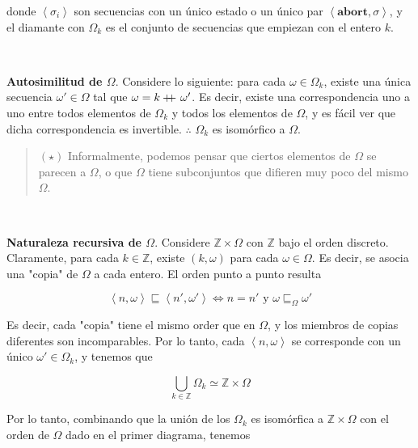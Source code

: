 \documentclass[a4paper, 12pt]{article}
\newcommand\doubleplus{+\kern-1.3ex+\kern0.8ex}
\begin{document}
donde $\left<\sigma_i \right>$ son secuencias con un único estado o un único par
$\left<\textbf{abort}, \sigma \right>$, y el diamante con $\Omega_k$ es el conjunto de
secuencias que empiezan con el entero $k$.

~

\textbf{Autosimilitud de $\Omega$}. Considere lo siguiente: para cada $\omega \in \Omega_k$, existe una única
secuencia $\omega'\in \Omega$ tal que $\omega = k \doubleplus \omega'$. Es
decir, existe una correspondencia uno a uno entre todos elementos de $\Omega_k$ y
todos los elementos de $\Omega$, y es fácil ver que dicha correspondencia es
invertible. $\therefore $ $\Omega_k$ es isomórfico a $\Omega$.

\begin{quote}
$(\star)$ Informalmente, podemos pensar que ciertos elementos de $\Omega$ se parecen a
$\Omega$, o que $\Omega$ tiene subconjuntos que difieren muy poco del mismo
$\Omega$.
\end{quote}
~ 

\textbf{Naturaleza recursiva de $\Omega$}. Considere $\mathbb{Z} \times \Omega$ con $\mathbb{Z}$ bajo el orden discreto.
Claramente, para cada $k \in \mathbb{Z}$, existe $(k, \omega)$ para cada $\omega
\in \Omega$. Es decir, se asocia una "copia" de $\Omega$ a cada entero. El orden
punto a punto resulta 

\begin{equation*}
  \left<n, \omega \right> \sqsubseteq \left<n', \omega' \right> 
\iff n = n' \text{ y } \omega
  \sqsubseteq_\Omega \omega'
\end{equation*}

Es decir, cada "copia" tiene el mismo order que en $\Omega$, y los miembros de
copias diferentes son incomparables. Por lo tanto, cada $\left<n,
\omega\right>$ se corresponde con un único $\omega' \in \Omega_k$, y tenemos que 

\begin{equation*}
  \bigcup_{k \in \mathbb{Z}} \Omega_k \simeq \mathbb{Z} \times \Omega
\end{equation*}

Por lo tanto, combinando que la unión de los $\Omega_k$ es isomórfica a $\mathbb{Z} \times
\Omega$ con el orden de $\Omega$ dado en el primer diagrama, tenemos

\begin{figure}
\centering
{}
\end{figure} 
\end{document}
